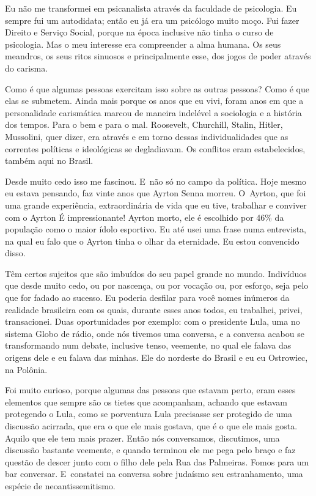  

Eu não me transformei em psicanalista através da faculdade de
psicologia. Eu sempre fui um autodidata; então eu já era um psicólogo
muito moço. Fui fazer Direito e Serviço Social, porque na época
inclusive não tinha o curso de psicologia. Mas o meu interesse era
compreender a alma humana. Os seus meandros, os seus ritos sinuosos e
principalmente esse, dos jogos de poder através do carisma.

 

Como é que algumas pessoas exercitam isso sobre as outras pessoas? Como
é que elas se submetem. Ainda mais porque os anos que eu vivi, foram
anos em que a personalidade carismática marcou de maneira indelével a
sociologia e a história dos tempos. Para o bem e para o mal. Roosevelt,
Churchill, Stalin, Hitler, Mussolini, quer dizer, era através e em torno
dessas individualidades que as correntes políticas e ideológicas se
degladiavam. Os conflitos eram estabelecidos, também aqui no Brasil.

 

Desde muito cedo isso me fascinou. E~não só no campo da política. Hoje
mesmo eu estava pensando, faz vinte anos que Ayrton Senna morreu. O~Ayrton, que foi uma grande experiência, extraordinária de vida que eu
tive, trabalhar e conviver com o Ayrton É impressionante! Ayrton morto,
ele é escolhido por 46\% da população como o maior ídolo esportivo. Eu
até usei uma frase numa entrevista, na qual eu falo que o Ayrton tinha o
olhar da eternidade. Eu estou convencido disso.

 

Têm certos sujeitos que são imbuídos do seu papel grande no mundo.
Indivíduos que desde muito cedo, ou por nascença, ou por vocação ou, por
esforço, seja pelo que for fadado ao sucesso. Eu poderia desfilar para
você nomes inúmeros da realidade brasileira com os quais, durante esses
anos todos, eu trabalhei, privei, transacionei. Duas oportunidades por
exemplo: com o presidente Lula, uma no sistema Globo de rádio, onde nós
tivemos uma conversa, e a conversa acabou se transformando num debate,
inclusive tenso, veemente, no qual ele falava das origens dele e eu
falava das minhas. Ele do nordeste do Brasil e eu eu Ostrowiec, na Polônia.

 

Foi muito curioso, porque algumas das pessoas que estavam perto, eram 
esses elementos que sempre são os tietes
que acompanham, achando que estavam protegendo o Lula, como se
porventura Lula precisasse ser protegido de uma discussão acirrada, que
era o que ele mais gostava, que é o que ele mais gosta. Aquilo que ele
tem mais prazer. Então nós conversamos, discutimos, uma discussão
bastante veemente, e quando terminou ele me pega pelo braço e faz
questão de descer junto com o filho dele pela Rua das Palmeiras. Fomos
para um bar conversar. E~constatei na conversa sobre judaísmo seu
estranhamento, uma espécie de neoantissemitismo. 

